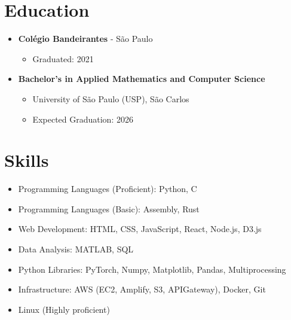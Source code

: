\documentclass[a4paper,12pt]{article}
\begin{document}
\section*{Education}
\vspace{-0.5em}
\begin{itemize}[leftmargin=*, itemsep=-1.5pt]
  \item \textbf{Colégio Bandeirantes} - São Paulo
    \begin{itemize}[itemsep=-1pt]
      \item Graduated: 2021
    \end{itemize}
  \item \textbf{Bachelor's in Applied Mathematics and Computer Science}
    \begin{itemize}[itemsep=-1pt]
      \item University of São Paulo (USP), São Carlos
      \item Expected Graduation: 2026
    \end{itemize}
\end{itemize}
\vspace{-0.5em}

\section*{Skills}
\vspace{-0.5em}
\begin{itemize}[leftmargin=*, itemsep=-1.5pt]
  \item Programming Languages (Proficient): Python, C
  \item Programming Languages (Basic): Assembly, Rust
  \item Web Development: HTML, CSS, JavaScript, React, Node.js, D3.js
  \item Data Analysis: MATLAB, SQL
  \item Python Libraries: PyTorch, Numpy, Matplotlib, Pandas, Multiprocessing
  \item Infrastructure: AWS (EC2, Amplify, S3, APIGateway), Docker, Git
  \item Linux (Highly proficient)
\end{itemize}
\vspace{-0.5em}
\end{document}
